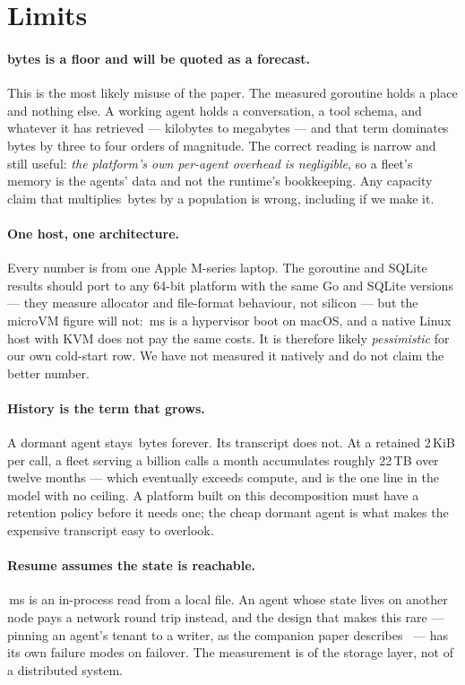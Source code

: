 \section{Limits}
\label{sec:limits}

\paragraph{\rGoPer{} bytes is a floor and will be quoted as a forecast.}
This is the most likely misuse of the paper. The measured goroutine holds a
place and nothing else. A working agent holds a conversation, a tool schema, and
whatever it has retrieved --- kilobytes to megabytes --- and that term dominates
\rGoPer{}\,bytes by three to four orders of magnitude. The correct reading is
narrow and still useful: \emph{the platform's own per-agent overhead is
negligible}, so a fleet's memory is the agents' data and not the runtime's
bookkeeping. Any capacity claim that multiplies \rGoPer{}\,bytes by a population
is wrong, including if we make it.

\paragraph{One host, one architecture.}
Every number is from one Apple M-series laptop. The goroutine and SQLite results
should port to any 64-bit platform with the same Go and SQLite versions --- they
measure allocator and file-format behaviour, not silicon --- but the microVM
figure will not: \rVm{}\,ms is a hypervisor boot on macOS, and a native Linux
host with KVM does not pay the same costs. It is therefore likely
\emph{pessimistic} for our own cold-start row. We have not measured it natively
and do not claim the better number.

\paragraph{History is the term that grows.}
A dormant agent stays \rFleetPer{}\,bytes forever. Its transcript does not. At a
retained 2\,KiB per call, a fleet serving a billion calls a month accumulates
roughly 22\,TB over twelve months \modeled{} --- which eventually exceeds
compute, and is the one line in the model with no ceiling. A platform built on
this decomposition must have a retention policy before it needs one; the cheap
dormant agent is what makes the expensive transcript easy to overlook.

\paragraph{Resume assumes the state is reachable.}
\rFleetResume{}\,ms is an in-process read from a local file. An agent whose state
lives on another node pays a network round trip instead, and the design that
makes this rare --- pinning an agent's tenant to a writer, as the companion
paper describes~\cite{unifiedtenant} --- has its own failure modes on failover.
The measurement is of the storage layer, not of a distributed system.

